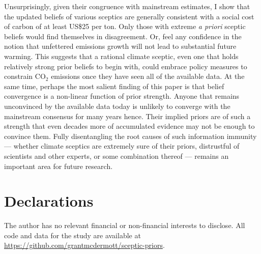 \documentclass[smallextended]{svjour3}       %
\begin{document}
Unsurprisingly, given their congruence with mainstream estimates, I show
that the updated beliefs of various sceptics are generally consistent
with a social cost of carbon of at least US\$25 per ton. Only those with
extreme \emph{a priori} sceptic beliefs would find themselves in
disagreement. Or, feel any confidence in the notion that unfettered
emissions growth will not lead to substantial future warming. This
suggests that a rational climate sceptic, even one that holds relatively
strong prior beliefs to begin with, could embrace policy measures to
constrain CO\(_2\) emissions once they have seen all of the available
data. At the same time, perhaps the most salient finding of this paper
is that belief convergence is a non-linear function of prior strength.
Anyone that remains unconvinced by the available data today is unlikely
to converge with the mainstream consensus for many years hence. Their
implied priors are of such a strength that even decades more of
accumulated evidence may not be enough to convince them. Fully
disentangling the root causes of such information immunity --- whether
climate sceptics are extremely sure of their priors, distrustful of
scientists and other experts, or some combination thereof --- remains an
important area for future research.

\hypertarget{declarations}{%
\section*{Declarations}\label{declarations}}

The author has no relevant financial or non-financial interests to
disclose. All code and data for the study are available at
\url{https://github.com/grantmcdermott/sceptic-priors}.



\end{document}
